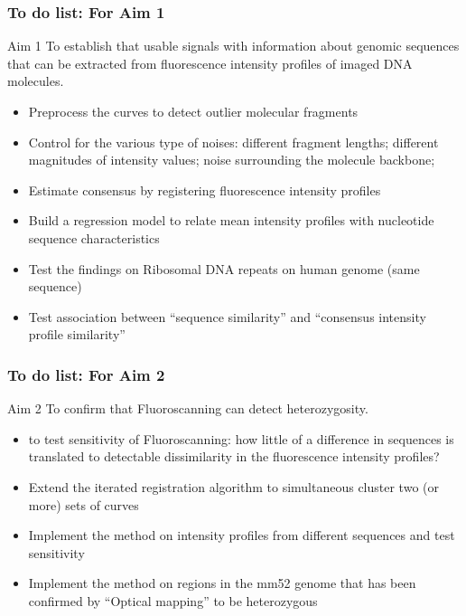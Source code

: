 \documentclass[10pt,dvipsnames,table]{beamer}
\begin{document}

\begin{frame}
\frametitle{To do list: For Aim 1}
\begin{block}{Aim 1}
To establish that usable signals with information about genomic sequences that can be extracted from fluorescence intensity profiles of imaged DNA molecules.
\end{block}
\begin{itemize}
\item[\checkmark] Preprocess the curves to detect outlier molecular fragments
\item[\checkmark] Control for the various type of noises: different fragment lengths; different magnitudes of intensity values; noise surrounding the molecule backbone; 
\item[\checkmark] Estimate consensus by registering fluorescence intensity profiles
\item Build a regression model to relate mean intensity profiles with nucleotide sequence characteristics
\item Test the findings on Ribosomal DNA repeats on human genome (same sequence)
\item Test association between ``sequence similarity'' and ``consensus intensity profile similarity''
\end{itemize}
\end{frame}

\begin{frame}
\frametitle{To do list: For Aim 2}
\begin{block}{Aim 2}
To confirm that Fluoroscanning can detect heterozygosity. 
\begin{itemize}
\footnotesize
\item to test sensitivity of Fluoroscanning: how little of a difference in sequences is translated to detectable dissimilarity in the fluorescence intensity profiles?
\end{itemize}
\end{block}
\begin{itemize}
\item Extend the iterated registration algorithm to simultaneous cluster two (or more) sets of curves
\item Implement the method on intensity profiles from different sequences and test sensitivity
\item Implement the method on regions in the mm52 genome that has been confirmed by ``Optical mapping'' to be heterozygous
\end{itemize}
\end{frame}
\end{document}
